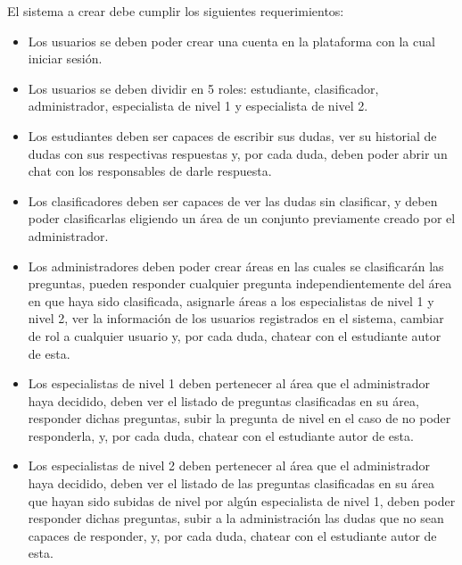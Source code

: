 El sistema a crear debe cumplir los siguientes requerimientos:
\begin{itemize}
	\item Los usuarios se deben poder crear una cuenta en la plataforma con la cual iniciar sesión.
	
	\item Los usuarios se deben dividir en 5 roles: estudiante, clasificador, administrador, especialista de nivel 1 y especialista de nivel 2.
	
	\item Los estudiantes deben ser capaces de escribir sus dudas, ver su historial de dudas con sus respectivas respuestas y, por cada duda, deben poder abrir un chat con los responsables de darle respuesta.
	
	\item Los clasificadores deben ser capaces de ver las dudas sin clasificar, y deben poder clasificarlas eligiendo un área de un conjunto previamente creado por el administrador.
	
	\item Los administradores deben poder crear áreas en las cuales se clasificarán las preguntas, pueden responder cualquier pregunta independientemente del área en que haya sido clasificada, asignarle áreas a los especialistas de nivel 1 y nivel 2, ver la información de los usuarios registrados en el sistema, cambiar de rol a cualquier usuario y, por cada duda, chatear con el estudiante autor de esta.
	
	\item Los especialistas de nivel 1 deben pertenecer al área que el administrador haya decidido, deben ver el listado de preguntas clasificadas en su área, responder dichas preguntas, subir la pregunta de nivel en el caso de no poder responderla, y, por cada duda, chatear con el estudiante autor de esta.
	
	\item Los especialistas de nivel 2 deben pertenecer al área que el administrador haya decidido, deben ver el listado de las preguntas clasificadas en su área que hayan sido subidas de nivel por algún especialista de nivel 1, deben poder responder dichas preguntas, subir a la administración las dudas que no sean capaces de responder, y, por cada duda, chatear con el estudiante autor de esta.
\end{itemize}